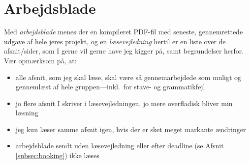 \section{Arbejdsblade}
\label{sec:workingpapers}
Med \emph{arbejdsblade} menes der en kompileret PDF-fil med seneste, gennemrettede udgave af hele jeres projekt, og en \emph{læsevejledning} hertil er en liste over de afsnit/sider, som I gerne vil gerne have jeg kigger på, samt begrundelser herfor.
Vær opmærksom på, at:
\begin{itemize}
\item alle afsnit, som jeg skal læse, skal være så gennemarbejdede som muligt og gennemlæst af hele gruppen---inkl.\ for stave- og grammatikfejl
\item jo flere afsnit I skriver i læsevejledningen, jo mere overfladisk bliver min læsning
\item jeg kun læser samme afsnit igen, hvis der er sket meget markante ændringer
\item arbejdsblade sendt uden læsevejledning eller efter deadline (se Afsnit \ref{subsec:booking}) ikke læses
\end{itemize}
